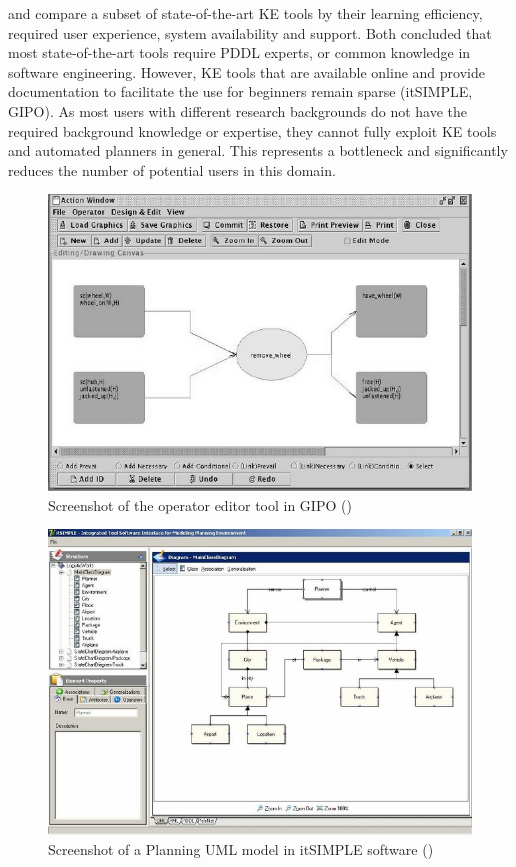 \cite{shah2013knowledge} and \cite{jilani2014automated} compare a subset of state-of-the-art KE tools by their learning efficiency, required user experience, system availability and support.
Both concluded that most state-of-the-art tools require PDDL experts, or common knowledge in software engineering.
However, KE tools that are available online and provide documentation to facilitate the use for beginners remain sparse (\eg itSIMPLE, GIPO).
As most users with different research backgrounds do not have the required background knowledge or expertise, they cannot fully exploit KE tools and automated planners in general.
This represents a bottleneck and significantly reduces the number of potential users in this domain.

\begin{figure}[h]
	\centering
	\includegraphics[width=0.7\linewidth]{figures/gipoaction}
	\caption{Screenshot of the operator editor tool in GIPO (\cite{mccluskey2005using})}
	\label{fig:gipoaction}
\end{figure}

\begin{figure}[h]
	\centering
	\includegraphics[width=0.7\linewidth]{figures/itsimple}
	\caption{Screenshot of a Planning UML model in itSIMPLE software (\cite{vaquero2013itsimple})}
	\label{fig:itSimple}
\end{figure}

